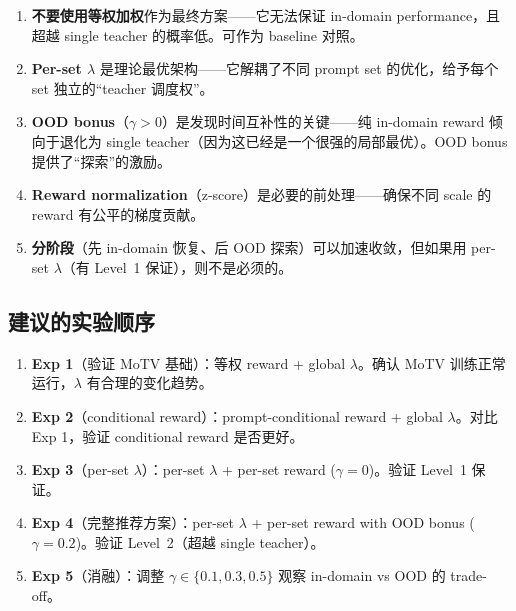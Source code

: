 \documentclass[11pt,a4paper]{article}
\theoremstyle{definition}
\begin{document}
\bigskip

\begin{tcolorbox}[colback=yellow!5, colframe=yellow!60!black, title=核心结论]
\begin{enumerate}[leftmargin=1.5em]
\item \textbf{不要使用等权加权}作为最终方案——它无法保证 in-domain performance，且超越 single teacher 的概率低。可作为 baseline 对照。

\item \textbf{Per-set $\lambda$} 是理论最优架构——它解耦了不同 prompt set 的优化，给予每个 set 独立的``teacher 调度权''。

\item \textbf{OOD bonus}（$\gamma > 0$）是发现时间互补性的关键——纯 in-domain reward 倾向于退化为 single teacher（因为这已经是一个很强的局部最优）。OOD bonus 提供了``探索''的激励。

\item \textbf{Reward normalization}（z-score）是必要的前处理——确保不同 scale 的 reward 有公平的梯度贡献。

\item \textbf{分阶段}（先 in-domain 恢复、后 OOD 探索）可以加速收敛，但如果用 per-set $\lambda$（有 Level~1 保证），则不是必须的。
\end{enumerate}
\end{tcolorbox}

\subsection{建议的实验顺序}

\begin{enumerate}[leftmargin=1.5em]
\item \textbf{Exp 1}（验证 MoTV 基础）：等权 reward + global $\lambda$。确认 MoTV 训练正常运行，$\lambda$ 有合理的变化趋势。
\item \textbf{Exp 2}（conditional reward）：prompt-conditional reward + global $\lambda$。对比 Exp 1，验证 conditional reward 是否更好。
\item \textbf{Exp 3}（per-set $\lambda$）：per-set $\lambda$ + per-set reward ($\gamma = 0$)。验证 Level~1 保证。
\item \textbf{Exp 4}（完整推荐方案）：per-set $\lambda$ + per-set reward with OOD bonus ($\gamma = 0.2$)。验证 Level~2（超越 single teacher）。
\item \textbf{Exp 5}（消融）：调整 $\gamma \in \{0.1, 0.3, 0.5\}$ 观察 in-domain vs OOD 的 trade-off。
\end{enumerate}
\end{document}

